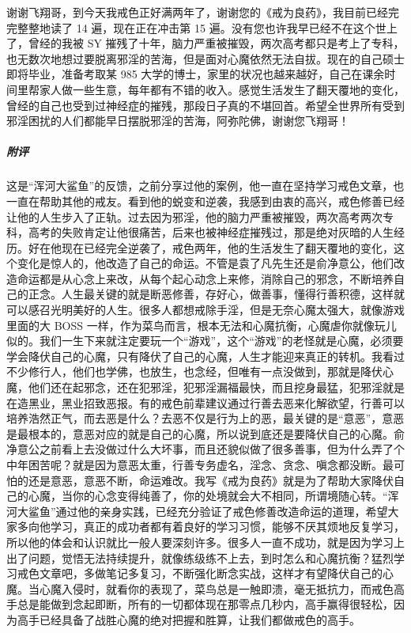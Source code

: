 \begin{case}
    谢谢飞翔哥，到今天我戒色正好满两年了，谢谢您的《戒为良药》，我目前已经完完整整地读了 14 遍，现在正在冲击第 15 遍。没有您也许我早已经不在这个世上了，曾经的我被 SY 摧残了十年，脑力严重被摧毁，两次高考都只是考上了专科，也无数次地想过要脱离邪淫的苦海，但是面对心魔依然无法自拔。现在的自己硕士即将毕业，准备考取某 985 大学的博士，家里的状况也越来越好，自己在课余时间里帮家人做一些生意，每年都有不错的收入。感觉生活发生了翻天覆地的变化，曾经的自己也受到过神经症的摧残，那段日子真的不堪回首。希望全世界所有受到邪淫困扰的人们都能早日摆脱邪淫的苦海，阿弥陀佛，谢谢您飞翔哥！
    \subparagraph{附评} 这是“浑河大鲨鱼”的反馈，之前分享过他的案例，他一直在坚持学习戒色文章，也一直在帮助其他的戒友。看到他的蜕变和逆袭，我感到由衷的高兴，戒色修善已经让他的人生步入了正轨。过去因为邪淫，他的脑力严重被摧毁，两次高考两次专科，高考的失败肯定让他很痛苦，后来也被神经症摧残过，那是绝对灰暗的人生经历。好在他现在已经完全逆袭了，戒色两年，他的生活发生了翻天覆地的变化，这个变化是惊人的，他改造了自己的命运。不管是袁了凡先生还是俞净意公，他们改造命运都是从心念上来改，从每个起心动念上来修，消除自己的邪念，不断培养自己的正念。人生最关键的就是断恶修善，存好心，做善事，懂得行善积德，这样就可以感召光明美好的人生。很多人都想戒除手淫，但是无奈心魔太强大，就像游戏里面的大 BOSS 一样，作为菜鸟而言，根本无法和心魔抗衡，心魔虐你就像玩儿似的。我们一生下来就注定要玩一个“游戏”，这个“游戏”的老怪就是心魔，必须要学会降伏自己的心魔，只有降伏了自己的心魔，人生才能迎来真正的转机。我看过不少修行人，他们也学佛，也放生，也念经，但唯有一点没做到，那就是降伏心魔，他们还在起邪念，还在犯邪淫，犯邪淫漏福最快，而且挖身最猛，犯邪淫就是在造黑业，黑业招致恶报。有的戒色前辈建议通过行善去恶来化解欲望，行善可以培养浩然正气，而去恶是什么？去恶不仅是行为上的恶，最关键的是“意恶”，意恶是最根本的，意恶对应的就是自己的心魔，所以说到底还是要降伏自己的心魔。俞净意公之前看上去没做过什么大坏事，而且还貌似做了很多善事，但为什么弄了个中年困苦呢？就是因为意恶太重，行善专务虚名，淫念、贪念、嗔念都没断。最可怕的还是意恶，意恶不断，命运难改。我写《戒为良药》就是为了帮助大家降伏自己的心魔，当你的心念变得纯善了，你的处境就会大不相同，所谓境随心转。“浑河大鲨鱼”通过他的亲身实践，已经充分验证了戒色修善改造命运的道理，希望大家多向他学习，真正的成功者都有着良好的学习习惯，能够不厌其烦地反复学习，所以他的体会和认识就比一般人要深刻许多。很多人一直不成功，就是因为学习上出了问题，觉悟无法持续提升，就像练级练不上去，到时怎么和心魔抗衡？猛烈学习戒色文章吧，多做笔记多复习，不断强化断念实战，这样才有望降伏自己的心魔。当心魔入侵时，就看你的表现了，菜鸟总是一触即溃，毫无抵抗力，而戒色高手总是能做到念起即断，所有的一切都体现在那零点几秒内，高手赢得很轻松，因为高手已经具备了战胜心魔的绝对把握和胜算，让我们都做戒色的高手。
\end{case}

